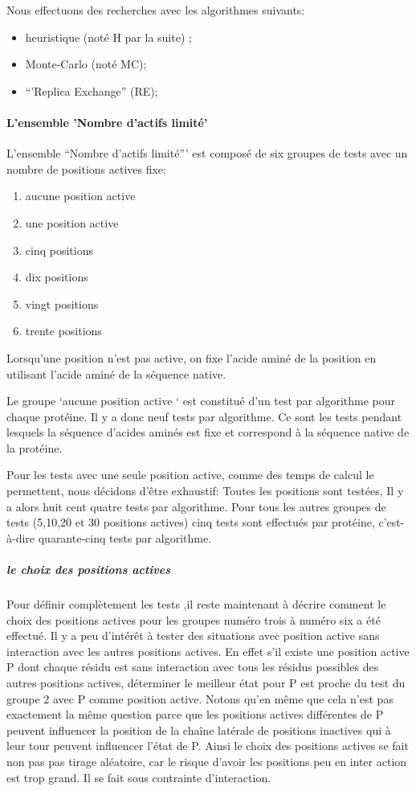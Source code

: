 Nous effectuons des recherches avec les algorithmes suivants:

\begin{itemize}
\item heuristique  (noté H par la suite) ;
\item Monte-Carlo (noté MC);
\item ``'Replica Exchange'' (RE);
\end{itemize}


\paragraph{L'ensemble 'Nombre d'actifs limité'}

L'ensemble ``Nombre d'actifs limité''' est composé de six groupes de tests avec un nombre de positions actives fixe:  


\begin{enumerate}
\item aucune position active
\item une position active 
\item cinq positions 
\item dix  positions 
\item vingt positions 
\item trente positions 
\end{enumerate}

Lorsqu'une position n'est pas active, on fixe l'acide aminé de la position en utilisant l'acide aminé de la séquence native.

Le groupe `aucune position active ` est constitué d'un test par algorithme pour chaque protéine. Il y a donc neuf tests par algorithme.
Ce sont les tests pendant lesquels  la séquence d'acides aminés est fixe et correspond à la séquence native de la protéine.

Pour les tests avec une seule position active, comme des temps de calcul le permettent, nous décidons d'être exhaustif:
Toutes les positions sont testées, Il y a alors huit cent quatre tests par algorithme.
Pour tous les autres groupes de tests (5,10,20 et 30 positions actives) cinq tests sont effectués par protéine, c'est-à-dire quarante-cinq tests par algorithme.

\subparagraph{le choix des positions actives}

Pour définir complètement les tests ,il reste maintenant à décrire comment le choix des positions actives pour les groupes numéro trois à numéro six a été effectué.
Il y a peu d'intérêt à tester des situations avec position active sans interaction avec les autres positions actives. 
En effet s'il existe une position active P dont chaque résidu est sans interaction avec tous les résidus possibles des autres positions actives, déterminer le meilleur état pour P est proche du test du groupe 2 avec P comme position active. Notons qu'en même que cela n'est pas exactement la même question parce que les positions actives différentes de P peuvent influencer la position de la chaîne latérale de positions inactives qui à leur tour peuvent influencer l'état de P.
Ainsi le choix des positions actives se fait non pas pas tirage aléatoire, car le risque d'avoir les positions peu en inter action est trop grand. Il se fait sous contrainte d'interaction.

